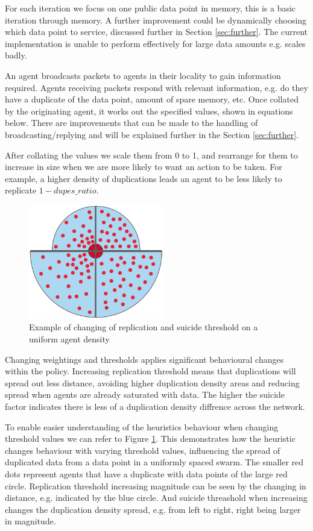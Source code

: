 \documentclass{UoYCSproject}
\begin{document}
For each iteration we focus on one public data point in memory, this is a basic iteration through memory.
A further improvement could be dynamically choosing which data point to service, discussed further in Section \ref{sec:further}.
The current implementation is unable to perform effectively for large data amounts e.g. scales badly.


An agent broadcasts packets to agents in their locality to gain information required.
Agents receiving packets respond with relevant information, e.g. do they have a duplicate of the data point, amount of spare memory, etc.
Once collated by the originating agent, it works out the specified values, shown in equations below.
There are improvements that can be made to the handling of broadcasting/replying and will be explained further in the Section \ref{sec:further}.

After collating the values we scale them from 0 to 1, and rearrange for them to increase in size when we are more likely to want an action to be taken.
For example, a higher density of duplications leads an agent to be less likely to replicate $1-dupes\_ratio$.

\begin{figure}[htb]
\label{fig:changing}
\begin{center}
\centering
\includegraphics[height=5cm]{"./ExplanationImgs/planned_changes.png"}
\caption{Example of changing of replication and suicide threshold on a uniform agent density}
\end{center}
\end{figure}

Changing weightings and thresholds applies significant behavioural changes within the policy.
Increasing replication threshold means that duplications will spread out less distance, avoiding higher duplication density areas and reducing spread when agents are already saturated with data.
The higher the suicide factor indicates there is less of a duplication density diffrence across the network.

To enable easier understanding of the heuristics behaviour when changing threshold values we can refer to Figure \ref{fig:changing}.
This demonstrates how the heuristic changes behaviour with varying threshold values, influencing the spread of duplicated data from a data point in a uniformly spaced swarm.
The smaller red dots represent agents that have a duplicate with data points of the large red circle.
Replication threshold increasing magnitude can be seen by the changing in distance, e.g. indicated by the blue circle.
And suicide threashold when increasing changes the duplication density spread, e.g. from left to right, right being larger in magnitude.
\end{document}
